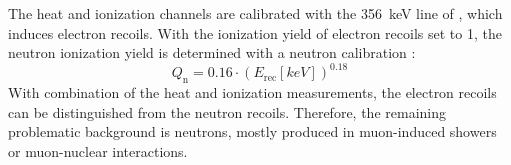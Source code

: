   The heat and ionization channels are calibrated with the \SI{356}{keV} line of , which induces electron recoils. With the ionization yield of electron recoils set to 1, the neutron ionization yield is determined with a neutron calibration \cite{Dis01}:
  \begin{equation}
    Q_{\mathrm{n}}=0.16\cdot(E_{\mathrm{rec}}[\si{keV}])^{0.18}
  \end{equation}
  With combination of the heat and ionization measurements, the electron recoils can be distinguished from the neutron recoils. Therefore, the remaining problematic background is neutrons, mostly produced in muon-induced showers or muon-nuclear interactions.
